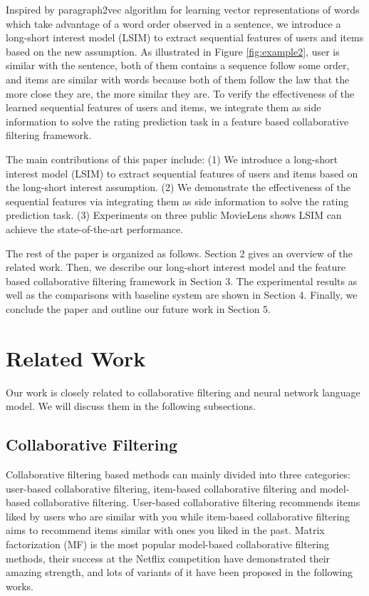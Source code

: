 \documentclass{llncs}
\begin{document}
Inspired by paragraph2vec algorithm \cite{le2014distributed} for
learning vector representations of words which take advantage of
a word order observed in a sentence,
we introduce a long-short interest model (LSIM) to extract sequential features
of users and items based on the new assumption.
As illustrated in Figure \ref{fig:example2}, user is similar with the sentence,
both of them contains a sequence follow some order,
and items are similar with words because both of them follow the law
that the more close they are, the more similar they are.
To verify the effectiveness of the learned sequential features of users
and items, we integrate them as side information to solve the rating prediction task
in a feature based collaborative filtering framework.

The main contributions of this paper include:
(1) We introduce a long-short interest model (LSIM) to extract sequential features
of users and items based on the long-short interest assumption.
(2) We demonstrate the effectiveness of the sequential features
via integrating them as side information to solve the rating prediction task.
(3) Experiments on three public MovieLens shows LSIM can achieve the state-of-the-art performance.

The rest of the paper is organized as follows. Section 2 gives an overview of the related work.
Then, we describe our long-short interest model and the feature based collaborative filtering
framework in Section 3. The experimental results as well as the comparisons with
baseline system are shown in Section 4.
Finally, we conclude the paper and outline our future work in Section 5.

\section{Related Work}
Our work is closely related to collaborative filtering and
neural network language model.
We will discuss them in the following subsections.

\subsection{Collaborative Filtering}
Collaborative filtering based methods can mainly divided into three categories:
user-based collaborative filtering, item-based collaborative filtering and
model-based collaborative filtering.
User-based collaborative filtering \cite{resnick1994grouplens} recommends
items liked by users who are similar with you
while item-based collaborative filtering \cite{sarwar2001item} aims to
recommend items similar with ones you liked in the past.
Matrix factorization (MF) is the most popular model-based collaborative filtering methods,
their success at the Netflix competition \cite{koren2009matrix, bennett2007netflix}
have demonstrated their amazing strength,
and lots of variants of it have been proposed in the following works.
\end{document}
